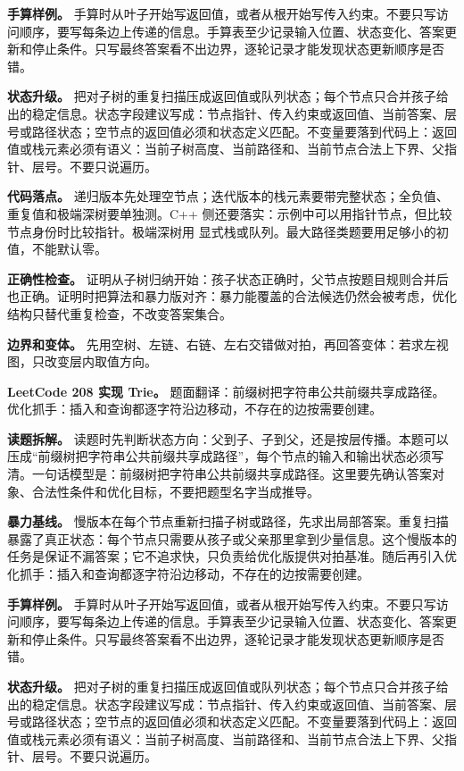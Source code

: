 \textbf{手算样例。} 手算时从叶子开始写返回值，或者从根开始写传入约束。不要只写访问顺序，要写每条边上传递的信息。手算表至少记录输入位置、状态变化、答案更新和停止条件。只写最终答案看不出边界，逐轮记录才能发现状态更新顺序是否错。

\textbf{状态升级。} 把对子树的重复扫描压成返回值或队列状态；每个节点只合并孩子给出的稳定信息。状态字段建议写成：节点指针、传入约束或返回值、当前答案、层号或路径状态；空节点的返回值必须和状态定义匹配。不变量要落到代码上：返回值或栈元素必须有语义：当前子树高度、当前路径和、当前节点合法上下界、父指针、层号。不要只说遍历。

\textbf{代码落点。} 递归版本先处理空节点；迭代版本的栈元素要带完整状态；全负值、重复值和极端深树要单独测。C++ 侧还要落实：示例中可以用指针节点，但比较节点身份时比较指针。极端深树用  显式栈或队列。最大路径类题要用足够小的初值，不能默认零。

\textbf{正确性检查。} 证明从子树归纳开始：孩子状态正确时，父节点按题目规则合并后也正确。证明时把算法和暴力版对齐：暴力能覆盖的合法候选仍然会被考虑，优化结构只替代重复检查，不改变答案集合。

\textbf{边界和变体。} 先用空树、左链、右链、左右交错做对拍，再回答变体：若求左视图，只改变层内取值方向。

\noindent\textbf{LeetCode 208 实现 Trie。} 题面翻译：前缀树把字符串公共前缀共享成路径。优化抓手：插入和查询都逐字符沿边移动，不存在的边按需要创建。

\textbf{读题拆解。} 读题时先判断状态方向：父到子、子到父，还是按层传播。本题可以压成“前缀树把字符串公共前缀共享成路径”，每个节点的输入和输出状态必须写清。一句话模型是：前缀树把字符串公共前缀共享成路径。这里要先确认答案对象、合法性条件和优化目标，不要把题型名字当成推导。

\textbf{暴力基线。} 慢版本在每个节点重新扫描子树或路径，先求出局部答案。重复扫描暴露了真正状态：每个节点只需要从孩子或父亲那里拿到少量信息。这个慢版本的任务是保证不漏答案；它不追求快，只负责给优化版提供对拍基准。随后再引入优化抓手：插入和查询都逐字符沿边移动，不存在的边按需要创建。

\textbf{手算样例。} 手算时从叶子开始写返回值，或者从根开始写传入约束。不要只写访问顺序，要写每条边上传递的信息。手算表至少记录输入位置、状态变化、答案更新和停止条件。只写最终答案看不出边界，逐轮记录才能发现状态更新顺序是否错。

\textbf{状态升级。} 把对子树的重复扫描压成返回值或队列状态；每个节点只合并孩子给出的稳定信息。状态字段建议写成：节点指针、传入约束或返回值、当前答案、层号或路径状态；空节点的返回值必须和状态定义匹配。不变量要落到代码上：返回值或栈元素必须有语义：当前子树高度、当前路径和、当前节点合法上下界、父指针、层号。不要只说遍历。

